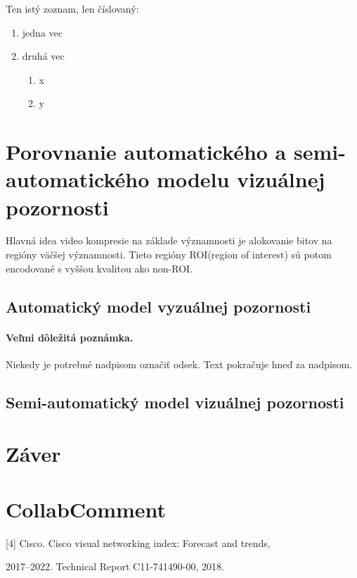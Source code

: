 \documentclass[10pt,twoside,slovak,a4paper]{article}
\begin{document}
Ten istý zoznam, len číslovaný:

\begin{enumerate}
\item jedna vec
\item druhá vec
	\begin{enumerate}
	\item x
	\item y
	\end{enumerate}
\end{enumerate}

\section{Porovnanie automatického a semi-automatického modelu vizuálnej pozornosti} \label{porovnanie}
Hlavná idea video kompresie na základe významnosti je alokovanie bitov na regióny väčšej významnosti. Tieto regióny ROI(region of interest) sú potom encodované s vyššou kvalitou ako non-ROI. 
\subsection{Automatický model vyzuálnej pozornosti} \label{auto}

\paragraph{Veľmi dôležitá poznámka.}
Niekedy je potrebné nadpisom označiť odsek. Text pokračuje hneď za nadpisom.



\subsection{Semi-automatický model vizuálnej pozornosti} \label{semi-auto}








\section{Záver} \label{zaver} %




\section{CollabComment} \label{comment}

[4] Cisco. Cisco visual networking index: Forecast and trends, 

2017–2022. Technical Report C11-741490-00, 2018.
\end{document}
